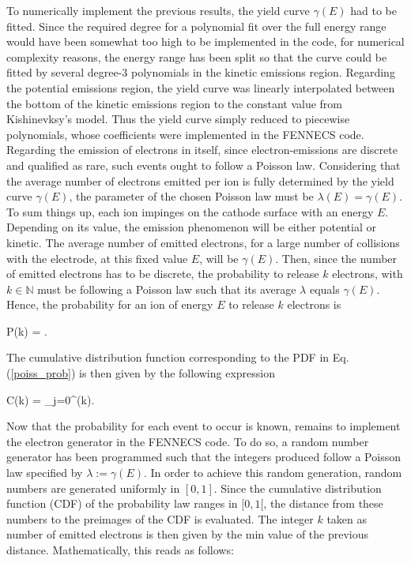 \noindent To numerically implement the previous results, the yield curve $\gamma(E)$ had to be fitted. Since the required degree for a polynomial fit over the full energy range would have been somewhat too high to be implemented in the code, for numerical complexity reasons, the energy range has been split so that the curve could be fitted by several degree-3 polynomials in the kinetic emissions region. Regarding the potential emissions region, the yield curve was linearly interpolated between the bottom of the kinetic emissions region to the constant value from Kishinevksy's model. Thus the yield curve simply reduced to piecewise polynomials, whose coefficients were implemented in the FENNECS code.\\

Regarding the emission of electrons in itself, since electron-emissions are discrete and qualified as rare, such events ought to follow a Poisson law. Considering that the average number of electrons emitted per ion is fully determined by the yield curve $\gamma(E)$, the parameter of the chosen Poisson law must be $\lambda(E) = \gamma(E)$. To sum things up, each ion impinges on the cathode surface with an energy $E$. Depending on its value, the emission phenomenon will be either potential or kinetic. The average number of emitted electrons, for a large number of collisions with the electrode, at this fixed value $E$, will be $\gamma(E)$. Then, since the number of emitted electrons has to be discrete, the probability to release $k$ electrons, with $k\in \mathbb{N}$ must be following a Poisson law such that its average $\lambda$ equals $\gamma(E)$. Hence, the probability for an ion of energy $E$ to release $k$ electrons is

\beq
P(k) = .\label{poiss_prob}
\eeq

\noindent The cumulative distribution function corresponding to the PDF in Eq.(\ref{poiss_prob}) is then given by the following expression 


\beq
C(k) = \sum_{j=0}^{\lfloor(k)\rfloor}. \label{poisson_dist}
\eeq


\noindent Now that the probability for each event to occur is known, remains to implement the electron generator in the FENNECS code. To do so, a random number generator has been programmed such that the integers produced follow a Poisson law specified by $\lambda := \gamma(E)$. In order to achieve this random generation, random numbers are generated uniformly in $[0,1]$. Since the cumulative distribution function (CDF) of the probability law ranges in $[0,1[$, the distance from these numbers to the preimages of the CDF is evaluated. The integer $k$ taken as number of emitted electrons is then given by the min value of the previous distance. Mathematically, this reads as follows: 

